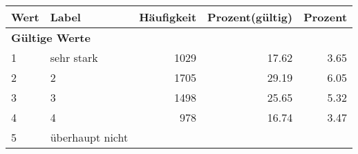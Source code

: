      \begin{longtable}{lXrrr}
     \toprule
     \textbf{Wert} & \textbf{Label} & \textbf{Häufigkeit} & \textbf{Prozent(gültig)} & \textbf{Prozent} \\
     \endhead
     \midrule
     \multicolumn{5}{l}{\textbf{Gültige Werte}}\\

     1 &
     \multicolumn{1}{X}{ sehr stark   } &


       \num{1029} &
       \num[round-mode=places,round-precision=2]{17,62} &
         \num[round-mode=places,round-precision=2]{3,65} \\

     2 &
     \multicolumn{1}{X}{ 2   } &


       \num{1705} &
       \num[round-mode=places,round-precision=2]{29,19} &
         \num[round-mode=places,round-precision=2]{6,05} \\

     3 &
     \multicolumn{1}{X}{ 3   } &


       \num{1498} &
       \num[round-mode=places,round-precision=2]{25,65} &
         \num[round-mode=places,round-precision=2]{5,32} \\

     4 &
     \multicolumn{1}{X}{ 4   } &


       \num{978} &
       \num[round-mode=places,round-precision=2]{16,74} &
         \num[round-mode=places,round-precision=2]{3,47} \\

     5 &
     \multicolumn{1}{X}{ überhaupt nicht   } &



\end{longtable}
